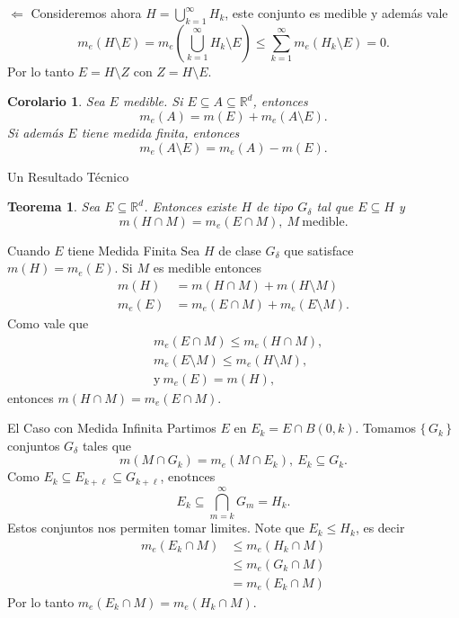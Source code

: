 \documentclass[utf8]{beamer}
\theoremstyle{plain}
\newtheorem{Th}{Teorema}               %
\newtheorem{Cor}{Corolario}            %
\theoremstyle{definition}
\theoremstyle{remark}
\numberwithin{equation}{section}
\newcommand{\dl}{\delta}                %
\newcommand{\bR}{\mathbb{R}}    %
\newcommand{\set}[1]{\{\,#1\,\}}    %
\renewcommand{\l}{\ell}                   %
\renewcommand{\leq}{\leqslant}          %
\newcommand{\less}{\setminus}           %
\newcommand{\suck}{_{k=1}^\infty} %
\renewcommand{\.}{\Cdot}                %
\begin{document}
\begin{frame}{$\Leftarrow$}
Consideremos ahora $H=\bigcup\suck H_k$, este conjunto es medible y adem\'as vale
$$m_e(H\less E)=m_e\left(\bigcup\suck H_k\less E\right)\leq \sum\suck m_e(H_k\less E)=0.$$
Por lo tanto $E=H\less Z$ con $Z=H\less E$.
\begin{Cor}\label{cor:Caratheodory}
Sea $E$ medible. Si $E\subseteq A\subseteq\bR^d$, entonces
$$m_e(A)=m(E)+m_e(A\less E).$$
Si adem\'as $E$ tiene medida finita, entonces
$$m_e(A\less E)=m_e(A)-m(E).$$
\end{Cor}
\end{frame}

\begin{frame}{Un Resultado T\'ecnico}
\begin{Th}\label{th:elTecnico}
  Sea $E\subseteq\bR^d$. Entonces existe $H$ de tipo $G_\dl$ tal que $E\subseteq H$ y 
  $$m(H\cap M)=m_e(E\cap M),\ M\ \text{medible}.$$
\end{Th}
\end{frame}

\begin{frame}{Cuando $E$ tiene Medida Finita}
  Sea $H$ de clase $G_\dl$ que satisface $m(H)=m_e(E)$. Si $M$ es medible entonces
  \begin{align*}
    m(H)&=m(H\cap M)+m(H\less M)\\
    m_e(E)&=m_e(E\cap M)+m_e(E\less M).
  \end{align*}
  Como vale que 
  \begin{align*}
    &m_e(E\cap M)\leq m_e(H\cap M),\\
    &m_e(E\less M)\leq m_e(H\less M),\\
    &\text{y}\ m_e(E)=m(H),
  \end{align*}
  entonces $m(H\cap M)=m_e(E\cap M)$.
\end{frame}

\begin{frame}{El Caso con Medida Infinita}
Partimos $E$ en $E_k=E\cap B(0,k)$. Tomamos $\set{G_k}$ conjuntos $G_\dl$ tales que 
$$m(M\cap G_k)=m_e(M\cap E_k),\ E_k\subseteq G_k.$$
Como $E_k\subseteq E_{k+\l}\subseteq G_{k+\l}$, enotnces 
$$E_k\subseteq \bigcap_{m=k}^\infty G_m=H_k.$$
Estos conjuntos nos permiten tomar limites. Note que $E_k\leq H_k$, es decir 
\begin{align*}
  m_e(E_k\cap M)&\leq m_e(H_k\cap M)\\
  &\leq m_e(G_k\cap M)\\
&= m_e(E_k\cap M)
\end{align*}
Por lo tanto $m_e(E_k\cap M)=m_e(H_k\cap M)$.
\end{frame}
    
\end{document}
